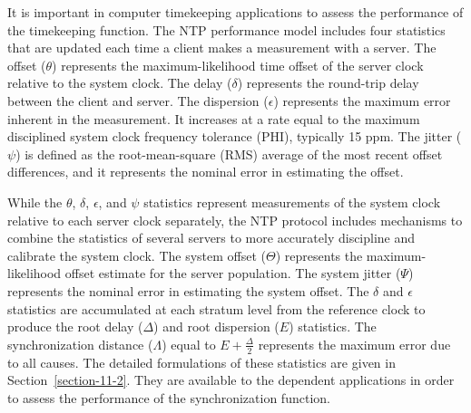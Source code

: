 It is important in computer timekeeping applications to assess the
performance of the timekeeping function. The NTP performance model
includes four statistics that are updated each time a client makes a
measurement with a server. The offset ($ \theta $) represents the
maximum-likelihood time offset of the server clock relative to the
system clock. The delay ($ \delta $) represents the round-trip delay
between the client and server. The dispersion ($ \epsilon $) represents
the maximum error inherent in the measurement. It increases at a
rate equal to the maximum disciplined system clock frequency
tolerance (PHI), typically 15 ppm. The jitter ($ \psi $) is defined as
the root-mean-square (RMS) average of the most recent offset
differences, and it represents the nominal error in estimating the
offset.

While the $ \theta $, $ \delta $, $ \epsilon $, and $ \psi $ statistics represent
measurements of the system clock relative to each server clock
separately, the NTP protocol includes mechanisms to combine the
statistics of several servers to more accurately discipline and
calibrate the system clock. The system offset ($ \Theta $) represents the
maximum-likelihood offset estimate for the server population. The
system jitter ($ \Psi $) represents the nominal error in estimating the
system offset. The $ \delta $ and $ \epsilon $ statistics are accumulated at
each stratum level from the reference clock to produce the root delay
($ \Delta $) and root dispersion ($ E $) statistics. The
synchronization distance ($ \Lambda $) equal to $ E + \frac{\Delta}{2} $
represents the maximum error due to all causes. The detailed
formulations of these statistics are given in Section~\ref{section-11-2}. They are
available to the dependent applications in order to assess the
performance of the synchronization function.
